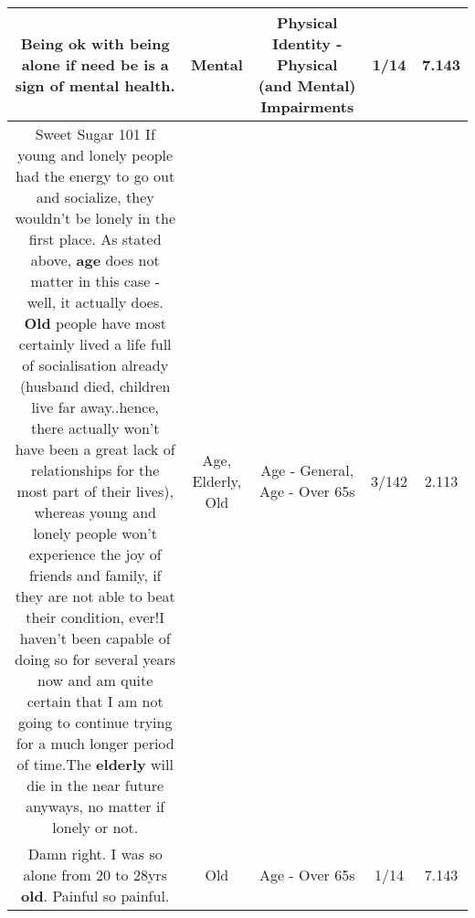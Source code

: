 \documentclass[11pt]{article}
\newlength\mylength
\begin{document}
\begin{center}
\begin{longtable}{|C{.65\mylength}|C{.30\mylength}|C{.12\mylength}|C{.12\mylength}|C{.12\mylength}|}
  \small Being ok with being alone if need be is a sign of \textbf{mental} health.\normalsize   & Mental & Physical Identity - Physical (and Mental) Impairments & 1/14 & 7.143 \\  \hline
  \small Sweet Sugar 101 If young and lonely people had the energy to go out and socialize, they wouldn't be lonely in the first place. As stated above, \textbf{age} does not matter in this case - well, it actually does. \textbf{Old} people have most certainly lived a life full of socialisation already (husband died, children live far away..hence, there actually  won't have been a great lack of relationships for the most part of their lives), whereas young and lonely people won't experience the joy of friends and family, if they are not able to beat their condition, ever!I haven't been capable of doing so for several years now and am quite certain that I am not going to continue trying for a much longer period of time.The \textbf{elderly} will die in the near future anyways, no matter if lonely or not.\normalsize   & Age, Elderly, Old & Age - General, Age - Over 65s & 3/142 & 2.113 \\  \hline
  \small Damn right. I was so alone from 20 to 28yrs \textbf{old}. Painful so painful.\normalsize   & Old & Age - Over 65s & 1/14 & 7.143 \\  \hline

\end{longtable}
\end{center}
\end{document}
